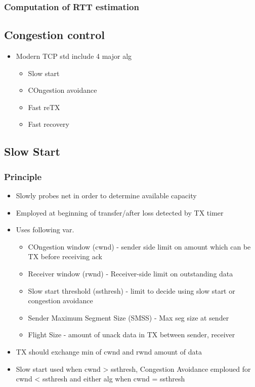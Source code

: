 \subsubsection{Computation of RTT estimation}
\subsection{Congestion control}
\begin{itemize}
	\item Modern TCP std include 4 major alg
	\begin{itemize}
		\item Slow start
		\item COngestion avoidance
		\item Fast reTX
		\item Fast recovery
	\end{itemize}
\end{itemize}
\subsection{Slow Start}
\subsubsection{Principle}
\begin{itemize}
	\item Slowly probes net in order to determine available capacity
	\item Employed at beginning of transfer/after loss detected by TX timer
	\item Uses following var.
		\begin{itemize}
			\item COngestion window (cwnd) - sender side limit on
				amount which can be TX before receiving ack
			\item Receiver window (rwnd) - Receiver-side limit on
				outstanding data
			\item Slow start threshold (ssthresh) - limit to decide
				using slow start or congestion avoidance
			\item Sender Maximum Segment Size (SMSS) - Max seg size
				at sender
			\item Flight Size - amount of unack data in TX between
				sender, receiver
		\end{itemize}
	\item TX should exchange min of cwnd and rwnd amount of data
	\item Slow start used when cwnd > ssthresh, Congestion Avoidance
		emploued for cwnd < ssthresh and either alg when cwnd = ssthresh
\end{itemize}
